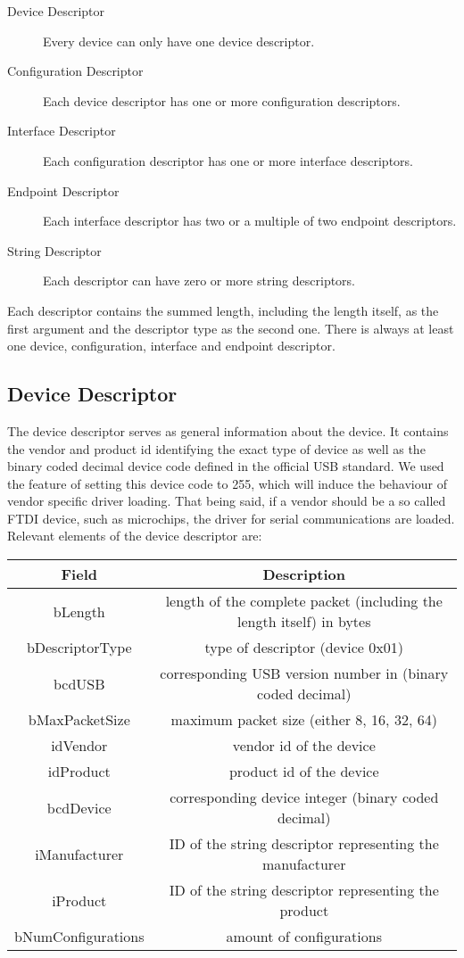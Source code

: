 \begin{description}
 \item[Device Descriptor] Every device can only have one device descriptor.
 \item[Configuration Descriptor] Each device descriptor has one or more configuration descriptors.
 \item[Interface Descriptor] Each configuration descriptor has one or more interface descriptors.
 \item[Endpoint  Descriptor] Each interface descriptor has two or a multiple of two endpoint descriptors.
 \item[String Descriptor] Each descriptor can have zero or more string descriptors.
\end{description}
Each descriptor contains the summed length, including the length itself, as the first argument and the descriptor type as the second one. There is 
always at least one device, configuration, interface and endpoint descriptor.

\subsection{Device Descriptor}
The device descriptor serves as general information about the device. It contains the vendor and product id identifying the exact type of device as 
well as the binary coded decimal device code defined in the official USB standard. We used the feature of setting this device code to 255, which will 
induce the behaviour of vendor specific driver loading. That being said, if a vendor should be a so called FTDI device, such as microchips, the 
driver for serial communications are loaded. Relevant elements of the device descriptor are: 


\begin{tabular}{c|c}
Field & Description \\ \hline
bLength & length of the complete packet (including the length itself) in bytes \\
bDescriptorType & type of descriptor (device 0x01) \\
bcdUSB & corresponding USB version number in (binary coded decimal) \\ 
bMaxPacketSize & maximum packet size (either 8, 16, 32, 64)\\
idVendor & vendor id of the device\\
idProduct & product id of the device\\ 
bcdDevice & corresponding device integer (binary coded decimal) \\
iManufacturer & ID of the string descriptor representing the manufacturer\\
iProduct & ID of the string descriptor representing the product \\
bNumConfigurations & amount of configurations \\
 
\end{tabular}

